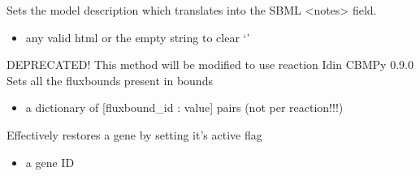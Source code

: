 \documentclass[letterpaper,10pt,english]{sphinxmanual}
\begin{document}
\begin{fulllineitems}
\begin{fulllineitems}
\begin{itemize}
\end{itemize}

\end{fulllineitems}


\begin{fulllineitems}
\label{\detokenize{modules_doc:cbmpy.CBModel.Model.setDescription}}
\pysigstartsignatures
{}
\pysigstopsignatures
\sphinxAtStartPar
Sets the model description which translates into the SBML \textless{}notes\textgreater{} field.
\begin{itemize}
\item {} 
\sphinxAtStartPar
{} any valid html or the empty string to clear ‘’

\end{itemize}

\end{fulllineitems}


\begin{fulllineitems}
\label{\detokenize{modules_doc:cbmpy.CBModel.Model.setFluxBoundsFromDict}}
\pysigstartsignatures
{}
\pysigstopsignatures
\sphinxAtStartPar
DEPRECATED! This method will be modified to use reaction Idin CBMPy 0.9.0
Sets all the fluxbounds present in bounds
\begin{itemize}
\item {} 
\sphinxAtStartPar
{} a dictionary of {[}fluxbound\_id : value{]} pairs (not per reaction!!!)

\end{itemize}

\end{fulllineitems}


\begin{fulllineitems}
\label{\detokenize{modules_doc:cbmpy.CBModel.Model.setGeneActive}}
\pysigstartsignatures
{}
\pysigstopsignatures
\sphinxAtStartPar
Effectively restores a gene by setting it’s active flag
\begin{itemize}
\item {} 
\sphinxAtStartPar
{} a gene ID


\end{itemize}
\end{fulllineitems}
\end{fulllineitems}
\end{document}
